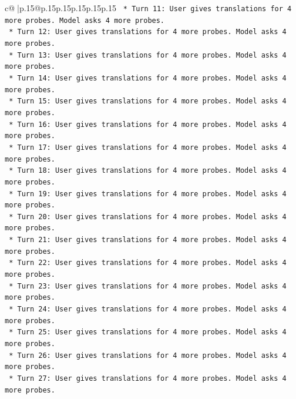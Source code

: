 \documentclass{article}
\begin{document}
{\begin{supertabular}{c@{$\;$}|p{.15\linewidth}@{}p{.15\linewidth}p{.15\linewidth}p{.15\linewidth}p{.15\linewidth}p{.15\linewidth}}
{{{\texttt{                    *   Turn 11: User gives translations for 4 more probes. Model asks 4 more probes.} \\
\texttt{                    *   Turn 12: User gives translations for 4 more probes. Model asks 4 more probes.} \\
\texttt{                    *   Turn 13: User gives translations for 4 more probes. Model asks 4 more probes.} \\
\texttt{                    *   Turn 14: User gives translations for 4 more probes. Model asks 4 more probes.} \\
\texttt{                    *   Turn 15: User gives translations for 4 more probes. Model asks 4 more probes.} \\
\texttt{                    *   Turn 16: User gives translations for 4 more probes. Model asks 4 more probes.} \\
\texttt{                    *   Turn 17: User gives translations for 4 more probes. Model asks 4 more probes.} \\
\texttt{                    *   Turn 18: User gives translations for 4 more probes. Model asks 4 more probes.} \\
\texttt{                    *   Turn 19: User gives translations for 4 more probes. Model asks 4 more probes.} \\
\texttt{                    *   Turn 20: User gives translations for 4 more probes. Model asks 4 more probes.} \\
\texttt{                    *   Turn 21: User gives translations for 4 more probes. Model asks 4 more probes.} \\
\texttt{                    *   Turn 22: User gives translations for 4 more probes. Model asks 4 more probes.} \\
\texttt{                    *   Turn 23: User gives translations for 4 more probes. Model asks 4 more probes.} \\
\texttt{                    *   Turn 24: User gives translations for 4 more probes. Model asks 4 more probes.} \\
\texttt{                    *   Turn 25: User gives translations for 4 more probes. Model asks 4 more probes.} \\
\texttt{                    *   Turn 26: User gives translations for 4 more probes. Model asks 4 more probes.} \\
\texttt{                    *   Turn 27: User gives translations for 4 more probes. Model asks 4 more probes.} \\
}}}
\end{supertabular}}
\end{document}
